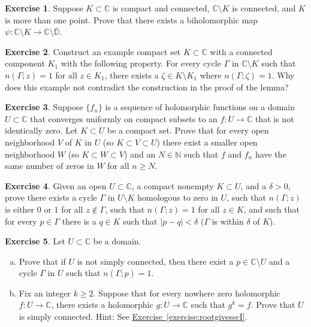 \documentclass[12pt,openany]{book}
\newcommand{\sabs}[1]{\lvert {#1} \rvert}
\newcommand{\C}{{\mathbb{C}}}
\newcommand{\N}{{\mathbb{N}}}
\newcommand{\D}{{\mathbb{D}}}
\theoremstyle{plain}
\theoremstyle{remark}
\theoremstyle{definition}
\newenvironment{exbox}{%
    \def\FrameCommand{\vrule width 1pt \relax\hspace{10pt}}%
    \MakeFramed{\advance\hsize-\width\FrameRestore}%
}{%
    \endMakeFramed
}
\newenvironment{exparts}{%
    \leavevmode\begin{enumerate}[a),noitemsep,topsep=0pt,parsep=0pt,partopsep=0pt]
}{%
    \end{enumerate}
}
\theoremstyle{exercise}
\newtheorem{exercise}{Exercise}[section]
\theoremstyle{example}
\newcommand{\exerciseref}[1]{\hyperref[#1]{Exercise~\ref*{#1}}}
\begin{document}
\begin{exbox}
\begin{exercise}
Suppose $K \subset \C$ is compact and connected, $\C \setminus K$ is
connected, and $K$ is more than one point.
Prove that there exists a biholomorphic
map $\psi \colon \C \setminus K \to \C \setminus \overline{\D}$.
\end{exercise}

\begin{exercise}
Construct an example compact set $K \subset \C$ with a connected component $K_1$
with the following property.
For every cycle $\Gamma$ in $\C \setminus K$ such that $n(\Gamma;z)=1$ for
all $z \in K_1$,
there exists a $\zeta \in K \setminus K_1$ where $n(\Gamma;\zeta)=1$.
Why does this example not contradict the construction in the proof of the lemma?
\end{exercise}

\begin{exercise}
Suppose $\{ f_n \}$ is a sequence of holomorphic functions on a domain
$U \subset \C$ that converges uniformly on compact subsets to
an
$f \colon U \to \C$ that is not identically zero.
Let $K \subset U$ be a compact set.  Prove that
for every open neighborhood $V$ of $K$ in $U$ (so $K \subset V \subset U$) there exist
a smaller open neighborhood $W$ (so $K \subset W \subset V$) and an $N \in \N$
such that $f$ and $f_n$ have the same number of zeros in $W$ for all
$n \geq N$.
\end{exercise}

\begin{exercise}
Given an open $U \subset \C$, a compact nonempty $K \subset U$, and a $\delta > 0$,
prove there
exists a cycle $\Gamma$ in $U \setminus K$ homologous to zero in $U$,
such that $n(\Gamma;z)$ is either $0$ or $1$ for all $z \notin \Gamma$,
such that
$n(\Gamma;z) = 1$ for all $z \in K$, 
and such that for every $p \in \Gamma$ there is a $q \in K$ such that
$\sabs{p-q} < \delta$ ($\Gamma$ is within $\delta$ of $K$).
\end{exercise}

\begin{exercise}\label{exercise:rootgivesscII}
Let $U \subset \C$ be a domain.
\begin{exparts}
\item
Prove that if $U$ is not simply connected, then there exist a $p \in \C
\setminus U$ and a cycle $\Gamma$ in $U$ such that $n(\Gamma;p)=1$.
\item
Fix an integer $k \geq 2$.
Suppose that for every nowhere zero holomorphic $f \colon U \to \C$,
there exists a holomorphic $g \colon U \to \C$ such that $g^k = f$.
Prove that $U$ is simply connected.
Hint: See \exerciseref{exercise:rootgivesscI}.
\end{exparts}
\end{exercise}
\end{exbox}
\end{document}
